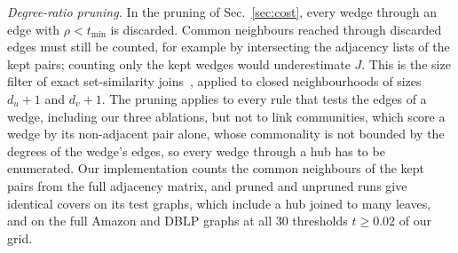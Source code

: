 \emph{Degree-ratio pruning.} In the pruning of Sec.~\ref{sec:cost}, every wedge through
an edge with $\rho<t_{\min}$ is discarded. Common neighbours reached through discarded
edges must still be counted, for example by intersecting the adjacency lists of the kept
pairs; counting only the kept wedges would underestimate $J$. This is the size filter of
exact set-similarity joins~\cite{arasu2006efficient,bayardo2007scaling}, applied to
closed neighbourhoods of sizes $d_u+1$ and $d_v+1$. The pruning applies to every rule
that tests the edges of a wedge, including our three ablations, but not to link
communities, which score a wedge by its non-adjacent pair alone, whose commonality is
not bounded by the degrees of the wedge's edges, so every wedge through a hub has to be
enumerated. Our implementation counts the common neighbours of the kept pairs from the
full adjacency matrix, and pruned and unpruned runs give identical covers on its test
graphs, which include a hub joined to many leaves, and on the full Amazon and DBLP graphs
at all 30 thresholds $t\ge0.02$ of our grid.

